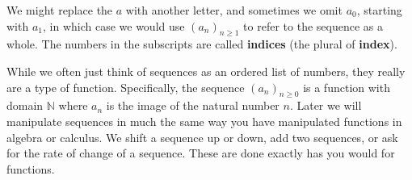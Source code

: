 \documentclass[10pt,]{book}
\newcommand{\terminology}[1]{\textbf{#1}}
\theoremstyle{plain}
\theoremstyle{definition}
\theoremstyle{definition}
\theoremstyle{definition}
\numberwithin{equation}{chapter}
\def\N{\mathbb N}
\begin{document}
\par

    We might replace the \(a\) with another letter, and sometimes we omit \(a_0\), starting with \(a_1\), in which case we would use \((a_n)_{n \ge 1}\) to refer to the sequence as a whole. The numbers in the subscripts are called \terminology{indices} (the plural of \terminology{index}). %
\par
While we often just think of sequences as an ordered list of numbers, they really are a type of function. Specifically, the sequence \((a_n)_{n\ge 0}\) is a function with domain \(\N\) where \(a_n\) is the image of the natural number \(n\). Later we will manipulate sequences in much the same way you have manipulated functions in algebra or calculus. We shift a sequence up or down, add two sequences, or ask for the rate of change of a sequence. These are done exactly has you would for functions.
\par
\end{document}
